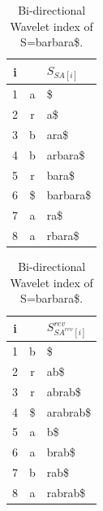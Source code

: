 \documentclass[11pt,a4paper]{report}
\begin{document}
\begin{table}[h]
\parbox{.45\linewidth}{
\centering
\begin{tabular}{ccl}
i& &$S_{SA[i]}$\\
\hline
1 & a & \$ \\
2 & r & a\$ \\
3 & b & ara\$ \\
4 & b & arbara\$ \\
5 & r & bara\$ \\
6 & \$ & barbara\$ \\
7 & a & ra\$ \\
8 & a & rbara\$ 
\end{tabular}
}
\hfill
\parbox{.45\linewidth}{
\centering
\begin{tabular}{ccl}
i&&$S^{rev}_{SA^{rev}[i]}$\\
\hline
1 & b & \$ \\
2 & r & ab\$ \\
3 & r & abrab\$ \\
4 & \$ & arabrab\$ \\
5 & a & b\$ \\
6 & a & brab\$ \\
7 & b & rab\$ \\
8 & a & rabrab\$ 
\end{tabular}
}
\caption{Bi-directional Wavelet index of S=barbara\$.}
\label{bi-dir_barbara}

\end{table}
\end{document}
